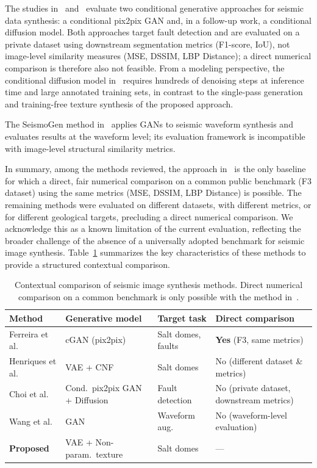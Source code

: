 \documentclass{ieeeaccess}
\begin{document}
The studies in~\cite{Choi2021} and~\cite{Choi2025} evaluate two conditional generative approaches for seismic data synthesis: a conditional pix2pix GAN and, in a follow-up work, a conditional diffusion model. Both approaches target fault detection and are evaluated on a private dataset using downstream segmentation metrics (F1-score, IoU), not image-level similarity measures (MSE, DSSIM, LBP Distance); a direct numerical comparison is therefore also not feasible. From a modeling perspective, the conditional diffusion model in~\cite{Choi2025} requires hundreds of denoising steps at inference time and large annotated training sets, in contrast to the single-pass generation and training-free texture synthesis of the proposed approach.

The SeismoGen method in~\cite{Wang2021} applies GANs to seismic waveform synthesis and evaluates results at the waveform level; its evaluation framework is incompatible with image-level structural similarity metrics.

In summary, among the methods reviewed, the approach in~\cite{Ferreira2020} is the only baseline for which a direct, fair numerical comparison on a common public benchmark (F3 dataset) using the same metrics (MSE, DSSIM, LBP Distance) is possible. The remaining methods were evaluated on different datasets, with different metrics, or for different geological targets, precluding a direct numerical comparison. We acknowledge this as a known limitation of the current evaluation, reflecting the broader challenge of the absence of a universally adopted benchmark for seismic image synthesis. Table~\ref{tab:comparison_overview} summarizes the key characteristics of these methods to provide a structured contextual comparison.

\begin{table}[htbp]
    \centering
    \caption{Contextual comparison of seismic image synthesis methods. Direct numerical comparison on a common benchmark is only possible with the method in~\cite{Ferreira2020}.}
    \label{tab:comparison_overview}
    \footnotesize
    \begin{tabular}{p{2.0cm}p{1.5cm}p{1.6cm}p{1.5cm}}
        \toprule
        \textbf{Method} & \textbf{Generative model} & \textbf{Target task} & \textbf{Direct comparison} \\
        \midrule
        Ferreira et al. & cGAN (pix2pix) & Salt domes, faults & \textbf{Yes} (F3, same metrics) \\
        Henriques et al. & VAE + CNF & Salt domes & No (different dataset \& metrics) \\
        Choi et al. & Cond.\ pix2pix GAN + Diffusion & Fault detection & No (private dataset, downstream metrics) \\
        Wang et al. & GAN & Waveform aug. & No (waveform-level evaluation) \\
        \midrule
        \textbf{Proposed} & VAE + Non-param.\ texture & Salt domes & --- \\
        \bottomrule
    \end{tabular}
\end{table}
\end{document}
